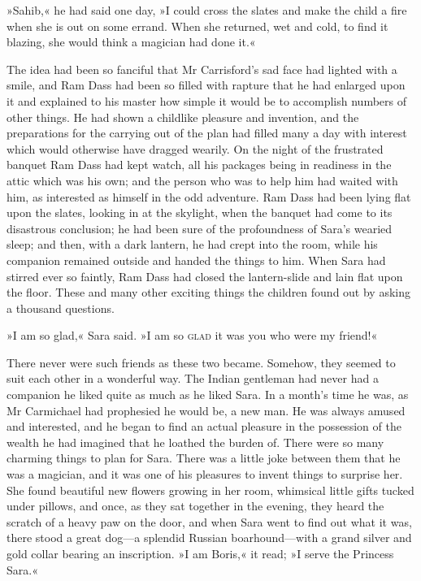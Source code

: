 »Sahib,« he had said one day, »I could cross the slates and make the child a fire when she is out on some errand. When she returned, wet and cold, to find it blazing, she would think a magician had done it.«

The idea had been so fanciful that Mr Carrisford's sad face had lighted with a smile, and Ram Dass had been so filled with rapture that he had enlarged upon it and explained to his master how simple it would be to accomplish numbers of other things. He had shown a childlike pleasure and invention, and the preparations for the carrying out of the plan had filled many a day with interest which would otherwise have dragged wearily. On the night of the frustrated banquet Ram Dass had kept watch, all his packages being in readiness in the attic which was his own; and the person who was to help him had waited with him, as interested as himself in the odd adventure. Ram Dass had been lying flat upon the slates, looking in at the skylight, when the banquet had come to its disastrous conclusion; he had been sure of the profoundness of Sara's wearied sleep; and then, with a dark lantern, he had crept into the room, while his companion remained outside and handed the things to him. When Sara had stirred ever so faintly, Ram Dass had closed the lantern-slide and lain flat upon the floor. These and many other exciting things the children found out by asking a thousand questions.

»I am so glad,« Sara said. »I am so \textsc{glad} it was you who were my friend!«

There never were such friends as these two became. Somehow, they seemed to suit each other in a wonderful way. The Indian gentleman had never had a companion he liked quite as much as he liked Sara. In a month's time he was, as Mr Carmichael had prophesied he would be, a new man. He was always amused and interested, and he began to find an actual pleasure in the possession of the wealth he had imagined that he loathed the burden of. There were so many charming things to plan for Sara. There was a little joke between them that he was a magician, and it was one of his pleasures to invent things to surprise her. She found beautiful new flowers growing in her room, whimsical little gifts tucked under pillows, and once, as they sat together in the evening, they heard the scratch of a heavy paw on the door, and when Sara went to find out what it was, there stood a great dog—a splendid Russian boarhound—with a grand silver and gold collar bearing an inscription. »I am Boris,« it read; »I serve the Princess Sara.«

